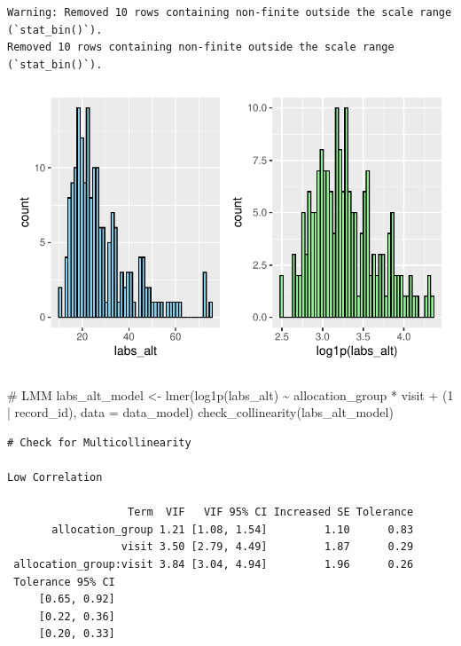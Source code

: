 \documentclass[
  letterpaper,
  DIV=11,
  numbers=noendperiod]{scrartcl}
\newenvironment{Shaded}{\begin{snugshade}}{\end{snugshade}}
\newcommand{\AttributeTok}[1]{\textcolor[rgb]{0.40,0.45,0.13}{#1}}
\newcommand{\CommentTok}[1]{\textcolor[rgb]{0.37,0.37,0.37}{#1}}
\newcommand{\DecValTok}[1]{\textcolor[rgb]{0.68,0.00,0.00}{#1}}
\newcommand{\FunctionTok}[1]{\textcolor[rgb]{0.28,0.35,0.67}{#1}}
\newcommand{\NormalTok}[1]{\textcolor[rgb]{0.00,0.23,0.31}{#1}}
\newcommand{\OtherTok}[1]{\textcolor[rgb]{0.00,0.23,0.31}{#1}}
\newcommand{\SpecialCharTok}[1]{\textcolor[rgb]{0.37,0.37,0.37}{#1}}
\begin{document}
\begin{verbatim}
Warning: Removed 10 rows containing non-finite outside the scale range (`stat_bin()`).
Removed 10 rows containing non-finite outside the scale range (`stat_bin()`).
\end{verbatim}

\includegraphics{Outcomes_V1V2V3_files/figure-pdf/labs_alt_1-1.pdf}

\begin{Shaded}
\begin{Highlighting}[]
\CommentTok{\# LMM}
\NormalTok{labs\_alt\_model }\OtherTok{\textless{}{-}} \FunctionTok{lmer}\NormalTok{(}\FunctionTok{log1p}\NormalTok{(labs\_alt) }\SpecialCharTok{\textasciitilde{}}\NormalTok{ allocation\_group }\SpecialCharTok{*}\NormalTok{ visit }\SpecialCharTok{+}\NormalTok{ (}\DecValTok{1} \SpecialCharTok{|}\NormalTok{ record\_id), }\AttributeTok{data =}\NormalTok{ data\_model)}
\FunctionTok{check\_collinearity}\NormalTok{(labs\_alt\_model)}
\end{Highlighting}
\end{Shaded}

\begin{verbatim}
# Check for Multicollinearity

Low Correlation

                   Term  VIF   VIF 95% CI Increased SE Tolerance
       allocation_group 1.21 [1.08, 1.54]         1.10      0.83
                  visit 3.50 [2.79, 4.49]         1.87      0.29
 allocation_group:visit 3.84 [3.04, 4.94]         1.96      0.26
 Tolerance 95% CI
     [0.65, 0.92]
     [0.22, 0.36]
     [0.20, 0.33]
\end{verbatim}
\end{document}

